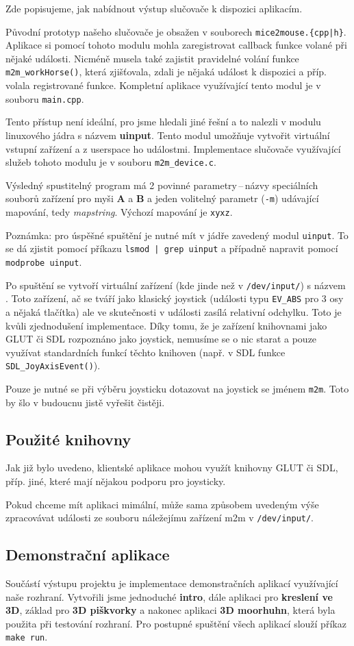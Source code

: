 Zde popisujeme, jak nabídnout výstup slučovače k dispozici aplikacím.

Původní prototyp našeho slučovače je obsažen v souborech {\tt mice2mouse.\{cpp|h\}}.
Aplikace si pomocí tohoto modulu mohla zaregistrovat callback funkce volané
při nějaké události. Nicméně musela také zajistit pravidelné volání funkce
{\tt m2m\_workHorse()}, která zjišťovala, zdali je nějaká událost k dispozici
a příp. volala registrované funkce. Kompletní aplikace využívající
tento modul je v souboru {\tt main.cpp}.

Tento přístup není ideální, pro jsme hledali jiné řešní a to nalezli
v modulu linuxového jádra s názvem {\bf uinput}. Tento modul umožňuje
vytvořit virtuální vstupní zařízení a z userspace ho  událostmi.
Implementace slučovače využívající služeb tohoto modulu je v souboru
{\tt m2m\_device.c}.

Výsledný spustitelný program má 2 povinné parametry\,--\,názvy speciálních
souborů zařízení pro myši {\bf A} a {\bf B} a jeden volitelný parametr
({\tt -m}) udávající mapování, tedy {\it mapstring}. Výchozí mapování
je {\tt xyxz}.

Poznámka: pro úspěšné spuštění je nutné mít v jádře zavedený modul {\tt uinput}.
To se dá zjistit pomocí příkazu {\tt lsmod | grep uinput} a případně
napravit pomocí {\tt modprobe uinput}.

Po spuštění se vytvoří virtuální zařízení (kde jinde než v {\tt /dev/input/})
s názvem . Toto zařízení, ač se tváří jako klasický joystick
(události typu {\tt EV\_ABS} pro 3 osy a nějaká tlačítka) ale ve skutečnosti
v události zasílá relativní odchylku. Toto je kvůli zjednodušení implementace.
Díky tomu, že je zařízení knihovnami jako GLUT či SDL rozpoznáno jako joystick,
nemusíme se o nic starat a pouze využívat standardních funkcí těchto knihoven
(např. v SDL funkce {\tt SDL\_JoyAxisEvent()}).

Pouze je nutné se při výběru joysticku dotazovat na joystick se jménem {\tt m2m}.
Toto by šlo v budoucnu jistě vyřešit čistěji.


\subsection{Použité knihovny}
Jak již bylo uvedeno, klientské aplikace mohou využít knihovny GLUT či
SDL, příp. jiné, které mají nějakou podporu pro joysticky.

Pokud chceme mít aplikaci mimální, může sama způsobem uvedeným výše
zpracovávat události ze souboru náležejímu zařízení m2m v {\tt /dev/input/}.

\subsection{Demonstrační aplikace}
Součástí výstupu projektu je implementace demonstračních aplikací využívající
naše rozhraní. Vytvořili jsme jednoduché {\bf intro}, dále aplikaci
pro {\bf kreslení ve 3D}, základ pro {\bf 3D piškvorky} a nakonec
aplikaci {\bf 3D moorhuhn}, která byla použita při testování rozhraní.
Pro postupné spuštění všech aplikací slouží příkaz {\tt make run}.

\clearpage
